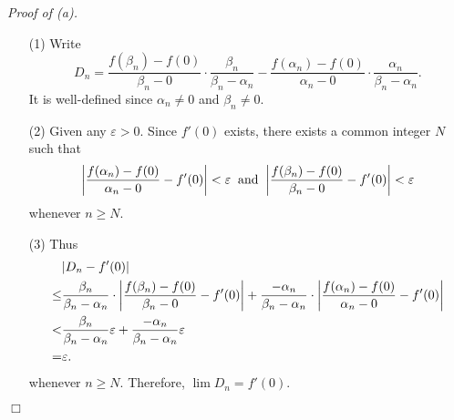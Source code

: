 \documentclass{article}
\begin{document}
\emph{Proof of (a).}
\begin{enumerate}
  \item[(1)]
  Write
  \[
    D_n = \frac{f(\beta_n) - f(0)}{\beta_n - 0} \cdot \frac{\beta_n}{\beta_n - \alpha_n}
      - \frac{f(\alpha_n) - f(0)}{\alpha_n - 0} \cdot \frac{\alpha_n}{\beta_n - \alpha_n}.
  \]
  It is well-defined since $\alpha_n \neq 0$ and $\beta_n \neq 0$.

  \item[(2)]
  Given any $\varepsilon > 0$.
  Since $f'(0)$ exists, there exists a common integer $N$ such that
  \[
    \abs{\frac{f(\alpha_n) - f(0)}{\alpha_n - 0} - f'(0)} < \varepsilon
    \: \text{ and } \:
    \abs{\frac{f(\beta_n) - f(0)}{\beta_n - 0} - f'(0)} < \varepsilon
  \]
  whenever $n \geq N$.

  \item[(3)]
  Thus
  \begin{align*}
    &|D_n - f'(0)| \\
    \leq&
    \frac{\beta_n}{\beta_n - \alpha_n}
      \cdot \abs{\frac{f(\beta_n) - f(0)}{\beta_n - 0} - f'(0)}
      + \frac{-\alpha_n}{\beta_n - \alpha_n}
      \cdot \abs{\frac{f(\alpha_n) - f(0)}{\alpha_n - 0} - f'(0)} \\
    <&
    \frac{\beta_n}{\beta_n - \alpha_n} \varepsilon
    + \frac{-\alpha_n}{\beta_n - \alpha_n} \varepsilon \\
    =& \varepsilon.
  \end{align*}
  whenever $n \geq N$.
  Therefore, $\lim{D_n} = f'(0)$.
\end{enumerate}
$\Box$ \\
\end{document}
